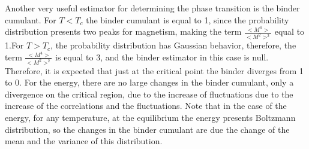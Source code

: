 \documentclass[article]{revtex4}
\begin{document}
Another very useful estimator for determining the phase transition is the binder cumulant. For $T <T_c$ the binder cumulant is equal to 1, since the probability distribution presents two peaks for magnetism, making the term $\frac{<M^{4}>}{<M^{2}>^{2}}$ equal to 1.For $T> T_c$, the probability distribution has Gaussian behavior, therefore, the term $\frac{<M^{4}>}{<M^{2}>^{2}}$ is equal to 3, and the binder estimator in this case is null. Therefore, it is expected that just at the critical point the binder diverges from 1 to 0. For the energy, there are no large changes in the binder cumulant, only a divergence on the critical region,
due to the increase of fluctuations due to the increase of the correlations and the fluctuations. Note that in the case of the energy, for any temperature, at the equilibrium the energy presents Boltzmann distribution, so the changes in the binder cumulant are due the change of the mean and the variance of this distribution.
\newpage
\end{document}
